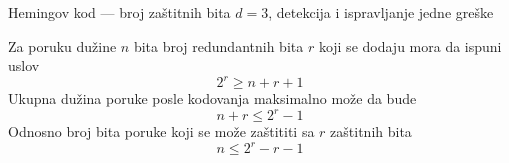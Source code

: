 \begin{frame}[label=06-s027]{Hemingov kod — broj zaštitnih bita}
\setlength{\parskip}{7pt}
$d=3$, detekcija i ispravljanje jedne greške\par\vspace{2mm}
Za poruku dužine $n$ bita broj redundantnih bita $r$ koji se dodaju mora da ispuni uslov
\[2^r\ge n+r+1\]
\vspace{2mm}Ukupna dužina poruke posle kodovanja maksimalno može da bude
\[n+r\le2^r-1\]
\vspace{2mm}Odnosno broj bita poruke koji se može zaštititi sa $r$ zaštitnih bita
\[n\le2^r-r-1\]
\end{frame}
